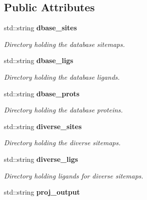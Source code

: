 \subsection*{Public Attributes}
\begin{CompactItemize}
\item 
std::string \bf{dbase\_\-sites}\label{classASCbase_1_1BaseParameters_4812fa282e2ba266dbfa064182b594b9}

\begin{CompactList}\small\item\em Directory holding the database sitemaps. \item\end{CompactList}\item 
std::string \bf{dbase\_\-ligs}\label{classASCbase_1_1BaseParameters_d6b47ad4d8d7460817551da93171de4a}

\begin{CompactList}\small\item\em Directory holding the database ligands. \item\end{CompactList}\item 
std::string \bf{dbase\_\-prots}\label{classASCbase_1_1BaseParameters_fbb9b1185a994a991c0e68c30fa637b6}

\begin{CompactList}\small\item\em Directory holding the database proteins. \item\end{CompactList}\item 
std::string \bf{diverse\_\-sites}\label{classASCbase_1_1BaseParameters_89d38ef4448211e8ae3a63988e62f158}

\begin{CompactList}\small\item\em Directory holding the diverse sitemaps. \item\end{CompactList}\item 
std::string \bf{diverse\_\-ligs}\label{classASCbase_1_1BaseParameters_7431a50f3120b7f9f74026ad2c10b1a2}

\begin{CompactList}\small\item\em Directory holding ligands for diverse sitemaps. \item\end{CompactList}\item 
std::string \bf{proj\_\-output}\label{classASCbase_1_1BaseParameters_96522745ba23c6aac7d9258d65aac545}


\end{CompactItemize}
